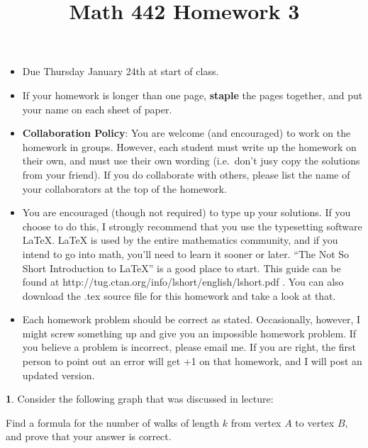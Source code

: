 \documentclass[12pt]{article}
\title{\vspace{-2.0cm}Math 442 Homework 3}
\date{}
\theoremstyle{definition}
\newtheorem{problem}{}
\begin{document}
%
%
\maketitle
%
\vspace{-16 mm}
\begin{itemize}
\item Due Thursday January 24th at start of class.
%
\item If your homework is longer than one page, {\bf staple} the pages together, and put your name on each sheet of paper.
%
\item {\bf Collaboration Policy}: You are welcome (and encouraged) to work on the homework in groups. However, each student must write up the homework on their own, and must use their own wording (i.e.~don't jusy copy the solutions from your friend). If you do collaborate with others, please list the name of your collaborators at the top of the homework.

\item You are encouraged (though not required) to type up your solutions. If you choose to do this, I strongly recommend that you use the typesetting software LaTeX. LaTeX is used by the entire mathematics community, and if you intend to go into math, you’ll need to learn it sooner or later. ``The Not So Short Introduction to LaTeX'' is a good place to start. This guide can be found at http://tug.ctan.org/info/lshort/english/lshort.pdf . You can also download the .tex source file for this homework and take a look at that.

\item Each homework problem should be correct as stated. Occasionally, however, I might screw something up and give you an impossible homework problem. If you believe a problem is incorrect, please email me. If you are right, the first person to point out an error will get +1 on that homework, and I will post an updated version. 
\end{itemize}


\begin{problem}
Consider the following graph that was discussed in lecture:\\
\begin{center}
\end{center}
Find a formula for the number of walks of length $k$ from vertex $A$ to vertex $B$, and prove that your answer is correct.
\end{problem}
\end{document}
